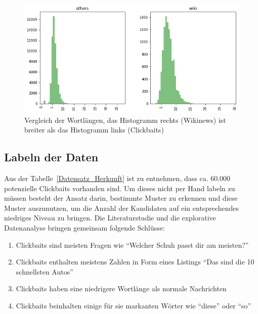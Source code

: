 \begin{figure}[H]
    \centering
    \includegraphics[width=14cm]{kapitel5/hist2.png}
    \caption[Vergleich der Wortlängen der Rohdaten]{Vergleich der Wortlängen, das Histogramm rechts (Wikinews) ist breiter als das Histogramm links (Clickbaits)}
    \label{Kap5:Hist2}
\end{figure}




\subsection{Labeln der Daten}
Aus der Tabelle~\ref{Datensatz_Herkunft} ist zu entnehmen, dass ca. 60.000 potenzielle Clickbaits vorhanden sind. Um dieses nicht per Hand labeln zu müssen besteht der Ansatz darin, bestimmte Muster zu erkennen und diese Muster auszunutzen, um die Anzahl der Kandidaten auf ein entsprechendes niedriges Niveau zu bringen. Die Literaturstudie und die explorative Datenanalyse bringen gemeinsam folgende Schlüsse:

\begin{enumerate}
    \item Clickbaits sind meisten Fragen wie \enquote{Welcher Schuh passt dir am meisten?}
    \item Clickbaits enthalten meistens Zahlen in Form eines Listings \enquote{Das sind die 10 schnellsten Autos}
    \item Clickbaits haben eine niedrigere Wortlänge als normale Nachrichten
    \item Clickbaits beinhalten einige für sie markanten Wörter wie \enquote{diese} oder \enquote{so}
\end{enumerate}

